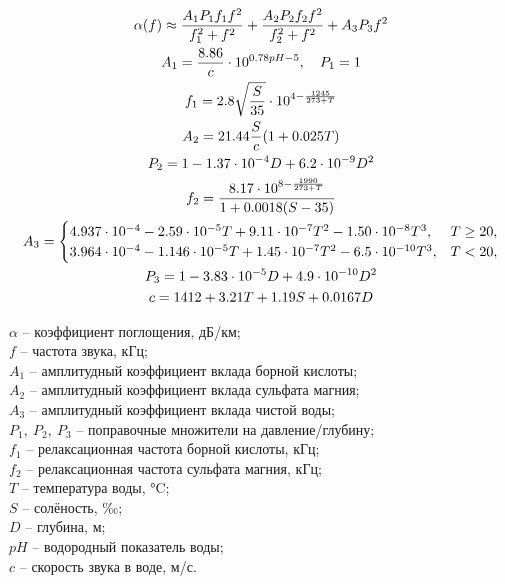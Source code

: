 \documentclass[
    numbers=section,
    document-code={ВКРБ--09.03.04--10.19--XX--26--81}
]{../latex/fqw}
\begin{document}
    \begin{gather}
        \alpha(f) \approx
        \frac{A_{1}P_{1}f_{1}f^{2}}{f_{1}^{2} + f^{2}} +
        \frac{A_{2}P_{2}f_{2}f^{2}}{f_{2}^{2} + f^{2}} +
        A_{3}P_{3}f^{2}
        \label{eq:francois_garrison_absorption}
        \\
        A_{1} = \frac{8.86}{c} \cdot {10}^{0.78pH - 5},\quad P_{1} = 1 \notag\\
        f_{1} = 2.8\sqrt{\frac{S}{35}} \cdot 10^{4 - \frac{1245}{273 + T}} \notag\\
        A_{2} = 21.44\frac{S}{c}(1 + 0.025T) \notag\\
        P_{2} = 1 - 1.37 \cdot 10^{-4}D + 6.2 \cdot 10^{-9}D^{2} \notag\\
        f_{2} = \frac{8.17 \cdot 10^{8 - \frac{1990}{273 + T}}}{1 + 0.0018(S - 35)}\notag\\
        A_{3} =
        \begin{cases}
            4.937 \cdot 10^{-4} - 2.59 \cdot 10^{-5}T + 9.11 \cdot 10^{-7}T^{2} - 1.50 \cdot 10^{-8}T^{3}, &
            T \geq 20,
            \\
            3.964 \cdot 10^{-4} - 1.146 \cdot 10^{-5}T + 1.45 \cdot 10^{-7}T^{2} - 6.5 \cdot 10^{-10}T^{3}, &
            T < 20,
        \end{cases}
        \notag\\
        P_{3} = 1 - 3.83 \cdot 10^{-5}D + 4.9 \cdot 10^{-10}D^{2} \notag\\
        c = 1412 + 3.21T + 1.19S + 0.0167D \notag
    \end{gather}
    \begin{FqwWhere}
        \(\alpha\) -- коэффициент поглощения, дБ/км;\\
        \(f\) -- частота звука, кГц;\\
        \(A_{1}\) -- амплитудный коэффициент вклада борной кислоты;\\
        \(A_{2}\) -- амплитудный коэффициент вклада сульфата магния;\\
        \(A_{3}\) -- амплитудный коэффициент вклада чистой воды;\\
        \(P_{1},\ P_{2},\ P_{3}\) -- поправочные множители на давление/глубину;\\
        \(f_{1}\) -- релаксационная частота борной кислоты, кГц;\\
        \(f_{2}\) -- релаксационная частота сульфата магния, кГц;\\
        \(T\) -- температура воды, °C;\\
        \(S\) -- солёность, ‰;\\
        \(D\) -- глубина, м;\\
        \(pH\) -- водородный показатель воды;\\
        \(c\) -- скорость звука в воде, м/с.
    \end{FqwWhere}
\end{document}
